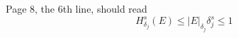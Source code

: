 Page 8, the 6th line, should read 
\begin{equation*}
    H_{\delta_j}^s(E)\leq |E|_{\delta_j}\delta_j^s\leq 1
\end{equation*}
